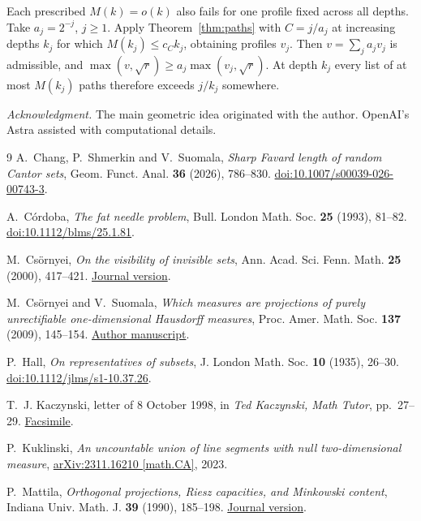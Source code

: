 \documentclass[11pt,reqno]{amsart}
\begin{document}
Each prescribed $M(k)=o(k)$ also fails for one profile fixed across all depths. Take $a_j=2^{-j}$, $j\ge1$. Apply Theorem~\ref{thm:paths} with $C=j/a_j$ at increasing depths $k_j$ for which $M(k_j)\le c_Ck_j$, obtaining profiles $v_j$. Then $v=\sum_j a_jv_j$ is admissible, and $\max(v,\sqrt r)\ge a_j\max(v_j,\sqrt r)$. At depth $k_j$ every list of at most $M(k_j)$ paths therefore exceeds $j/k_j$ somewhere.

\medskip
\noindent\textit{Acknowledgment.}
The main geometric idea originated with the author. OpenAI's Astra assisted with computational details.

\begin{thebibliography}{9}
A.~Chang, P.~Shmerkin and V.~Suomala,
\emph{Sharp Favard length of random Cantor sets},
Geom. Funct. Anal. \textbf{36} (2026), 786--830.
\href{https://doi.org/10.1007/s00039-026-00743-3}{doi:10.1007/s00039-026-00743-3}.

A.~C\'ordoba, \emph{The fat needle problem},
Bull. London Math. Soc. \textbf{25} (1993), 81--82.
\href{https://doi.org/10.1112/blms/25.1.81}{doi:10.1112/blms/25.1.81}.

M.~Cs\"ornyei, \emph{On the visibility of invisible sets},
Ann. Acad. Sci. Fenn. Math. \textbf{25} (2000), 417--421.
\href{https://www.acadsci.fi/mathematica/Vol25/csornyei.pdf}{Journal version}.

M.~Cs\"ornyei and V.~Suomala,
\emph{Which measures are projections of purely unrectifiable
one-dimensional Hausdorff measures},
Proc. Amer. Math. Soc. \textbf{137} (2009), 145--154.
\href{https://cc.oulu.fi/~vsuomala/cs.pdf}{Author manuscript}.

P.~Hall, \emph{On representatives of subsets},
J. London Math. Soc. \textbf{10} (1935), 26--30.
\href{https://doi.org/10.1112/jlms/s1-10.37.26}{doi:10.1112/jlms/s1-10.37.26}.

T.~J. Kaczynski, letter of 8 October 1998, in
\emph{Ted Kaczynski, Math Tutor}, pp.~27--29.
\href{https://archive.org/download/h.-prison-letters-by-and-to-ted-kaczynski/H29.\%20Ted\%20Kaczynski\%2C\%20math\%20tutor.pdf\#page=27}{Facsimile}.

P.~Kuklinski,
\emph{An uncountable union of line segments with null two-dimensional measure},
\href{https://arxiv.org/abs/2311.16210}{arXiv:2311.16210 [math.CA]}, 2023.

P.~Mattila, \emph{Orthogonal projections, Riesz capacities, and Minkowski content},
Indiana Univ. Math. J. \textbf{39} (1990), 185--198.
\href{https://iumj.org/article/3414/}{Journal version}.
\end{thebibliography}
\end{document}
